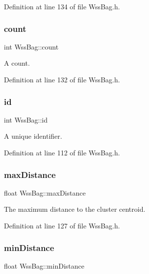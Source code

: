 Definition at line 134 of file Wss\+Bag.\+h.

\mbox{\label{class_wss_bag_a08a9a4fff1f870829390b302ce664569}} 
\subsubsection{\texorpdfstring{count}{count}}
{\footnotesize\ttfamily int Wss\+Bag\+::count\hspace{0.3cm}{\ttfamily [protected]}}

A count. 

Definition at line 132 of file Wss\+Bag.\+h.

\mbox{\label{class_wss_bag_ab428fb4d86dba46033e23d799ce48cbd}} 
\subsubsection{\texorpdfstring{id}{id}}
{\footnotesize\ttfamily int Wss\+Bag\+::id\hspace{0.3cm}{\ttfamily [protected]}}

A unique identifier. 

Definition at line 112 of file Wss\+Bag.\+h.

\mbox{\label{class_wss_bag_a22f03f5b980f81a16ef4dda0fbec1cb2}} 
\subsubsection{\texorpdfstring{max\+Distance}{maxDistance}}
{\footnotesize\ttfamily float Wss\+Bag\+::max\+Distance\hspace{0.3cm}{\ttfamily [protected]}}

The maximum distance to the cluster centroid. 

Definition at line 127 of file Wss\+Bag.\+h.

\mbox{\label{class_wss_bag_ab4b90933446259adba9c59cbadd8dfac}} 
\subsubsection{\texorpdfstring{min\+Distance}{minDistance}}
{\footnotesize\ttfamily float Wss\+Bag\+::min\+Distance\hspace{0.3cm}{\ttfamily [protected]}}

